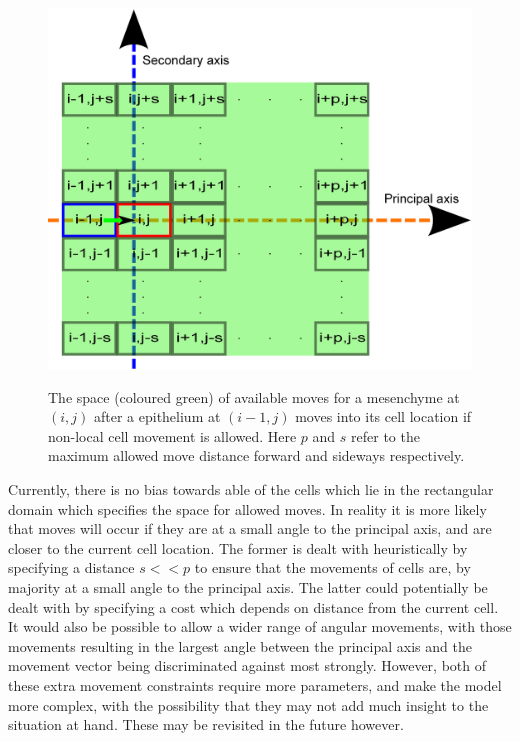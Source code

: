 \documentclass[pdftex,10pt,a4paper]{article}
\begin{document}
\begin{figure}[t] 
\centering
\scalebox{0.5} 
{\includegraphics{rectangular.eps}}
\caption{The space (coloured green) of available moves for a mesenchyme at $(i,j)$ after a epithelium at $(i-1,j)$ moves into its cell location if non-local cell movement is allowed. Here $p$ and $s$ refer to the maximum allowed move distance forward and sideways respectively.}\label{fig:rectangular}
\end{figure} 



Currently, there is no bias towards able of the cells which lie in the rectangular domain which specifies the space for allowed moves. In reality it is more likely that moves will occur if they are at a small angle to the principal axis, and are closer to the current cell location. The former is dealt with heuristically by specifying a distance $s<<p$ to ensure that the movements of cells are, by majority at a small angle to the principal axis. The latter could potentially be dealt with by specifying a cost which depends on distance from the current cell. It would also be possible to allow a wider range of angular movements, with those movements resulting in the largest angle between the principal axis and the movement vector being discriminated against most strongly. However, both of these extra movement constraints require more parameters, and make the model more complex, with the possibility that they may not add much insight to the situation at hand. These may be revisited in the future however.
\end{document}
